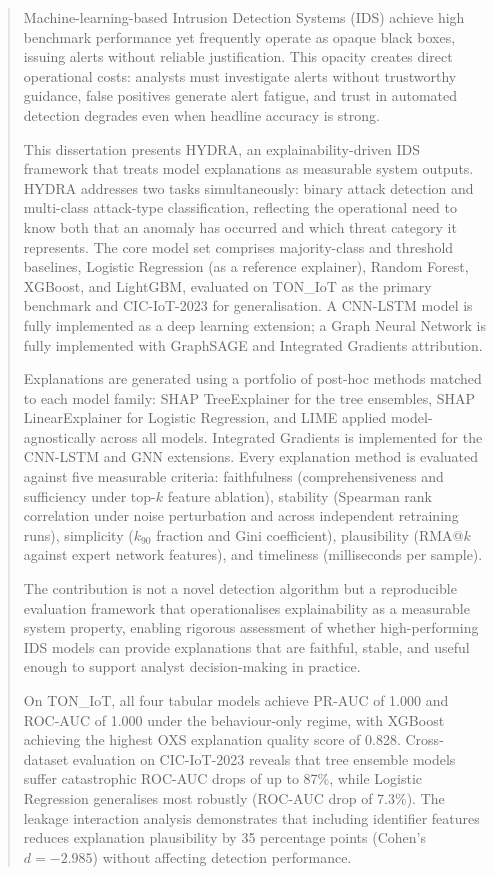 \documentclass[12pt,a4paper]{report}
\begin{document}
\newpage
\begin{abstract}
Machine-learning-based Intrusion Detection Systems (IDS) achieve high benchmark performance yet frequently operate as opaque black boxes, issuing alerts without reliable justification. This opacity creates direct operational costs: analysts must investigate alerts without trustworthy guidance, false positives generate alert fatigue, and trust in automated detection degrades even when headline accuracy is strong.

This dissertation presents HYDRA, an explainability-driven IDS framework that treats model explanations as measurable system outputs. HYDRA addresses two tasks simultaneously: binary attack detection and multi-class attack-type classification, reflecting the operational need to know both that an anomaly has occurred and which threat category it represents. The core model set comprises majority-class and threshold baselines, Logistic Regression (as a reference explainer), Random Forest, XGBoost, and LightGBM, evaluated on TON\_IoT as the primary benchmark and CIC-IoT-2023 for generalisation. A CNN-LSTM model is fully implemented as a deep learning extension; a Graph Neural Network is fully implemented with GraphSAGE and Integrated Gradients attribution.

Explanations are generated using a portfolio of post-hoc methods matched to each model family: SHAP TreeExplainer for the tree ensembles, SHAP LinearExplainer for Logistic Regression, and LIME applied model-agnostically across all models. Integrated Gradients is implemented for the CNN-LSTM and GNN extensions. Every explanation method is evaluated against five measurable criteria: faithfulness (comprehensiveness and sufficiency under top-$k$ feature ablation), stability (Spearman rank correlation under noise perturbation and across independent retraining runs), simplicity ($k_{90}$ fraction and Gini coefficient), plausibility (RMA@$k$ against expert network features), and timeliness (milliseconds per sample).

The contribution is not a novel detection algorithm but a reproducible evaluation framework that operationalises explainability as a measurable system property, enabling rigorous assessment of whether high-performing IDS models can provide explanations that are faithful, stable, and useful enough to support analyst decision-making in practice.

On TON\_IoT, all four tabular models achieve PR-AUC of 1.000 and ROC-AUC of 1.000 under the behaviour-only regime, with XGBoost achieving the highest OXS explanation quality score of 0.828. Cross-dataset evaluation on CIC-IoT-2023 reveals that tree ensemble models suffer catastrophic ROC-AUC drops of up to 87\%, while Logistic Regression generalises most robustly (ROC-AUC drop of 7.3\%). The leakage interaction analysis demonstrates that including identifier features reduces explanation plausibility by 35 percentage points (Cohen's $d = -2.985$) without affecting detection performance.
\end{abstract}
\end{document}
